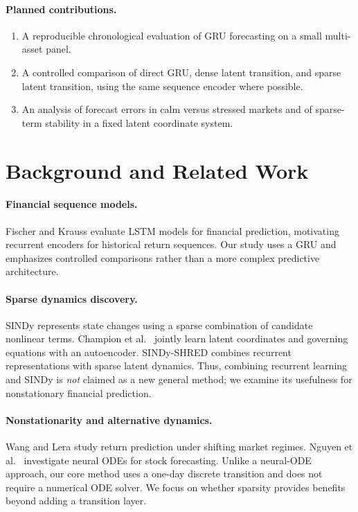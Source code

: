 \documentclass{article}
\begin{document}
\paragraph{Planned contributions.}
\begin{enumerate}
\item A reproducible chronological evaluation of GRU forecasting on a small multi-asset panel.
\item A controlled comparison of direct GRU, dense latent transition, and sparse latent transition, using the same sequence encoder where possible.
\item An analysis of forecast errors in calm versus stressed markets and of sparse-term stability in a fixed latent coordinate system.
\end{enumerate}

\section{Background and Related Work}
\paragraph{Financial sequence models.}
Fischer and Krauss \citep{fischer2018} evaluate LSTM models for financial prediction, motivating recurrent encoders for historical return sequences. Our study uses a GRU and emphasizes controlled comparisons rather than a more complex predictive architecture.

\paragraph{Sparse dynamics discovery.}
SINDy \citep{brunton2016} represents state changes using a sparse combination of candidate nonlinear terms. Champion et al.\ \citep{champion2019} jointly learn latent coordinates and governing equations with an autoencoder. SINDy-SHRED \citep{gao2026sindyshred} combines recurrent representations with sparse latent dynamics. Thus, combining recurrent learning and SINDy is \emph{not} claimed as a new general method; we examine its usefulness for nonstationary financial prediction.

\paragraph{Nonstationarity and alternative dynamics.}
Wang and Lera \citep{wang2026} study return prediction under shifting market regimes. Nguyen et al.\ \citep{nguyen2024} investigate neural ODEs for stock forecasting. Unlike a neural-ODE approach, our core method uses a one-day discrete transition and does not require a numerical ODE solver. We focus on whether sparsity provides benefits beyond adding a transition layer.
\end{document}
